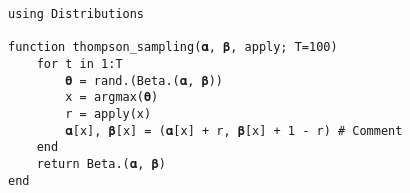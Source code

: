 \documentclass[12pt, oneside]{book}
\title{\booktitle}
\author{\authorname}
\theoremstyle{plain}
\theoremstyle{definition}
\begin{document}
% 

\frontmatter


% 

\newpage
\tableofcontents
% 

\mainmatter
\newpage

\begin{lstlisting}[language=JuliaLocal, style=julia]
using Distributions

function thompson_sampling(𝛂, 𝛃, apply; T=100)
    for t in 1:T
        𝛉 = rand.(Beta.(𝛂, 𝛃))
        x = argmax(𝛉)
        r = apply(x)
        𝛂[x], 𝛃[x] = (𝛂[x] + r, 𝛃[x] + 1 - r) # Comment
    end
    return Beta.(𝛂, 𝛃)
end
\end{lstlisting}








\end{document}
